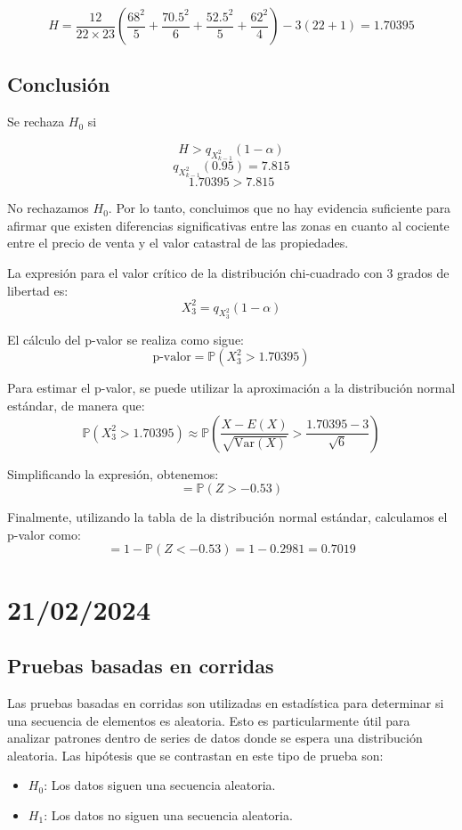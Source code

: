 \documentclass{article}
\begin{document}
\[ H = \frac{12}{22 \times 23} \left(\frac{68^2}{5} + \frac{70.5^2}{6} + \frac{52.5^2}{5} + \frac{62^2}{4}\right) - 3(22 + 1) = 1.70395 \]

\subsection*{Conclusión}

Se rechaza $H_0$ si

\[H > q_{X^{2}_{k-1}}(1 - \alpha)\]
\[q_{X^{2}_{k-1}}(0.95) = 7.815\]
\[1.70395 > 7.815\]

No rechazamos $H_0$. Por lo tanto, concluimos que no hay evidencia suficiente para afirmar que existen diferencias significativas entre las zonas en cuanto al cociente entre el precio de venta y el valor catastral de las propiedades.

La expresión para el valor crítico de la distribución chi-cuadrado con 3 grados de libertad es:
\[X^2_3 = q_{X^2_3}(1-\alpha)\]

El cálculo del p-valor se realiza como sigue:
\[\text{p-valor} = \mathbb{P}(X^2_3 > 1.70395)\]

Para estimar el p-valor, se puede utilizar la aproximación a la distribución normal estándar, de manera que:
\[\mathbb{P}(X^2_3 > 1.70395) \approx \mathbb{P}\left(\frac{X - E(X)}{\sqrt{\text{Var}(X)}} > \frac{1.70395 - 3}{\sqrt{6}}\right)\]

Simplificando la expresión, obtenemos:
\[ = \mathbb{P}(Z > -0.53)\]

Finalmente, utilizando la tabla de la distribución normal estándar, calculamos el p-valor como:
\[= 1 - \mathbb{P}(Z < -0.53) = 1 - 0.2981 = 0.7019\]

\section{21/02/2024}

\subsection{Pruebas basadas en corridas}

Las pruebas basadas en corridas son utilizadas en estadística para determinar si una secuencia de elementos es aleatoria. Esto es particularmente útil para analizar patrones dentro de series de datos donde se espera una distribución aleatoria. Las hipótesis que se contrastan en este tipo de prueba son:

\begin{itemize}
    \item $H_0$: Los datos siguen una secuencia aleatoria.
    \item $H_1$: Los datos no siguen una secuencia aleatoria.
\end{itemize}
\end{document}
